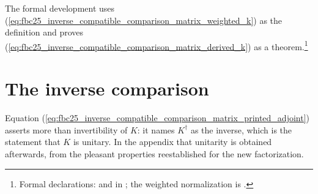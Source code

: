 \documentclass{article}
\begin{document}
The formal development uses
(\ref{eq:fbc25_inverse_compatible_comparison_matrix_weighted_k}) as the
definition and proves
(\ref{eq:fbc25_inverse_compatible_comparison_matrix_derived_k}) as a
theorem.\footnote{Formal declarations:
     and
     in
    ; the weighted
    normalization is .}

\section{The inverse comparison}

Equation
(\ref{eq:fbc25_inverse_compatible_comparison_matrix_printed_adjoint})
asserts more than invertibility of $K$: it names $K^\dagger$ as the inverse,
which is the statement that $K$ is unitary. In the appendix that unitarity is
obtained afterwards, from the pleasant properties reestablished for the new
factorization.
\end{document}
